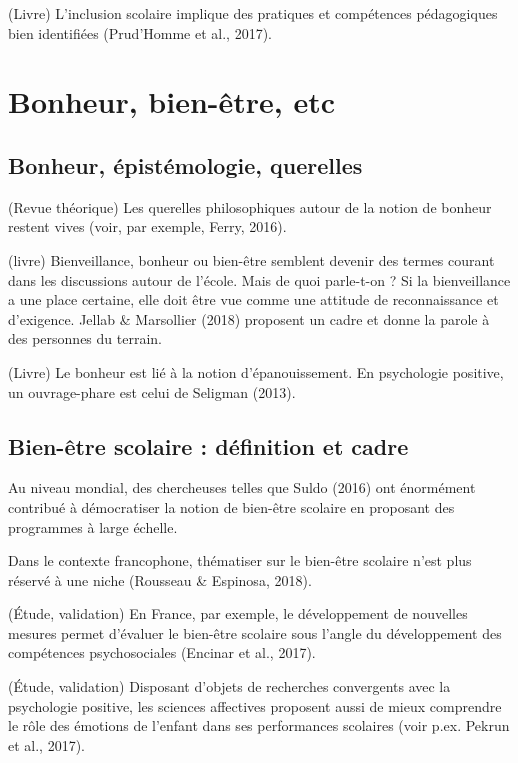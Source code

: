 \documentclass[
  french,
]{article}
\begin{document}
(Livre) L'inclusion scolaire implique des pratiques et compétences pédagogiques bien identifiées (Prud'Homme et al., 2017).

\hypertarget{bonheur-bien-uxeatre-etc}{%
\section{Bonheur, bien-être, etc}\label{bonheur-bien-uxeatre-etc}}

\hypertarget{bonheur-uxe9pistuxe9mologie-querelles}{%
\subsection{Bonheur, épistémologie, querelles}\label{bonheur-uxe9pistuxe9mologie-querelles}}

(Revue théorique) Les querelles philosophiques autour de la notion de bonheur restent vives (voir, par exemple, Ferry, 2016).

(livre) Bienveillance, bonheur ou bien-être semblent devenir des termes courant dans les discussions autour de l'école. Mais de quoi parle-t-on ? Si la bienveillance a une place certaine, elle doit être vue comme une attitude de reconnaissance et d'exigence. Jellab \& Marsollier (2018) proposent un cadre et donne la parole à des personnes du terrain.

(Livre) Le bonheur est lié à la notion d'épanouissement. En psychologie positive, un ouvrage-phare est celui de Seligman (2013).

\hypertarget{bien-uxeatre-scolaire-duxe9finition-et-cadre}{%
\subsection{Bien-être scolaire : définition et cadre}\label{bien-uxeatre-scolaire-duxe9finition-et-cadre}}

Au niveau mondial, des chercheuses telles que Suldo (2016) ont énormément contribué à démocratiser la notion de bien-être scolaire en proposant des programmes à large échelle.

Dans le contexte francophone, thématiser sur le bien-être scolaire n'est plus réservé à une niche (Rousseau \& Espinosa, 2018).

(Étude, validation) En France, par exemple, le développement de nouvelles mesures permet d'évaluer le bien-être scolaire sous l'angle du développement des compétences psychosociales (Encinar et al., 2017).

(Étude, validation) Disposant d'objets de recherches convergents avec la psychologie positive, les sciences affectives proposent aussi de mieux comprendre le rôle des émotions de l'enfant dans ses performances scolaires (voir p.ex. Pekrun et al., 2017).
\end{document}
